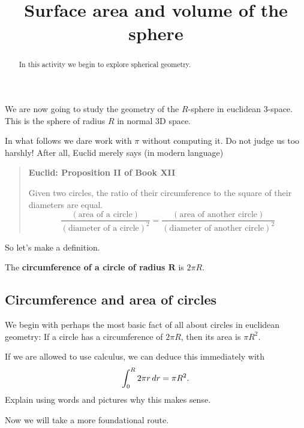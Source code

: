 \documentclass[hints,handout,noauthor,nooutcomes,12pt]{ximera}
\title{Surface area and volume of the sphere}
\begin{document}
\begin{abstract}
In this activity we begin to explore spherical geometry.
\end{abstract}
\maketitle


We are now going to study the geometry of the $R$-sphere in euclidean
$3$-space. This is the sphere of radius $R$ in normal $3$D space.



In what follows we dare work with $\pi$ without computing it. Do not
judge us too harshly! After all, Euclid merely says (in modern language)
\begin{quote}
  \textbf{Euclid: Proposition II of Book XII}
  
  Given two circles, the ratio of their circumference to the square of
  their diameters are equal.
  \[
  \frac{(\text{area of a circle})}{(\text{diameter of a circle})^2} =
  \frac{(\text{area of another circle})}{(\text{diameter of another
      circle})^2}
  \]
\end{quote}

So let's make a definition.

\begin{definition}
  The \textbf{circumference of a circle of radius $\boldsymbol R$} is $2\pi R$.
\end{definition}

\subsection{Circumference and area of circles}

We begin with perhaps the most basic fact of all about circles in
euclidean geometry: If a circle has a circumference of $2\pi R$, then
its area is $\pi R^2$.

\begin{problem}
  If we are allowed to use calculus, we can deduce this immediately with
  \[
  \int_0^R 2\pi r \,d r = \pi R^2.
  \]
  Explain using words and pictures why this makes sense.
\end{problem}


Now we will take a more foundational route.
\end{document}
